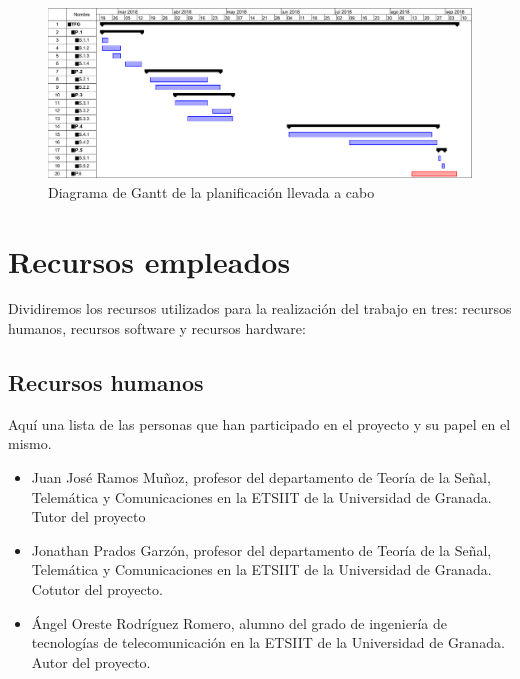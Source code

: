 \begin{figure}[H]
  \centering
  \includegraphics[scale=0.45]{imagenes/gant2}
  \caption{Diagrama de Gantt de la planificación llevada a cabo}
  \label{fig:gant2}
\end{figure}


\section{Recursos empleados}
Dividiremos los recursos utilizados para la realización del trabajo en tres: recursos humanos, recursos software y recursos hardware:

\subsection{Recursos humanos}
Aquí una lista de las personas que han participado en el proyecto y su papel en el mismo.
\begin{itemize}
\item Juan José Ramos Muñoz, profesor del departamento de Teoría de
la Señal, Telemática y Comunicaciones en la ETSIIT de la Universidad de Granada. Tutor del proyecto
\item Jonathan Prados Garzón, profesor del departamento de Teoría de
la Señal, Telemática y Comunicaciones en la ETSIIT de la Universidad de Granada.
Cotutor del proyecto.
\item Ángel Oreste Rodríguez Romero, alumno del grado de ingeniería de tecnologías de telecomunicación en la ETSIIT de la Universidad de Granada. Autor del proyecto.
\end{itemize}

